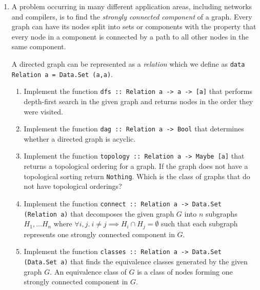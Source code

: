 \documentclass{article}
\def\code#1{\texttt{#1}}
\begin{document}
\begin{enumerate}
    \item \cite[p. 409]{thompson} A problem occurring in many different application areas, including networks and compilers, is to find the \textit{strongly connected component} of a graph. Every graph can have its nodes split into sets or components with the property that every node in a component is connected by a path to all other nodes in the same component. \par
    A directed graph can be represented as a \textit{relation} which we define as \code{data Relation a = Data.Set (a,a)}.
    \begin{enumerate}
        \item Implement the function \code{dfs :: Relation a -> a -> [a]} that performs depth-first search in the given graph and returns nodes in the order they were visited.
        \item Implement the function \code{dag :: Relation a -> Bool} that determines whether a directed graph is acyclic.
        \item Implement the function \code{topology :: Relation a -> Maybe [a]} that returns a topological ordering for a graph. If the graph does not have a topological sorting return \code{Nothing}. Which is the class of graphs that do not have topological orderings?
        \item Implement the function \code{connect :: Relation a -> Data.Set (Relation a)} that decomposes the given graph $G$ into $n$ subgraphs $H_1, \dots H_n$ where $\forall i,j.\ i \neq j \implies H_i \cap H_j = \emptyset$ such that each subgraph represents one strongly connected component in $G$.
        \item Implement the function \code{classes :: Relation a -> Data.Set (Data.Set a)} that finds the equivalence classes generated by the given graph $G$. An equivalence class of $G$ is a class of nodes forming one strongly connected component in $G$.
    \end{enumerate}


\end{enumerate}
\end{document}
